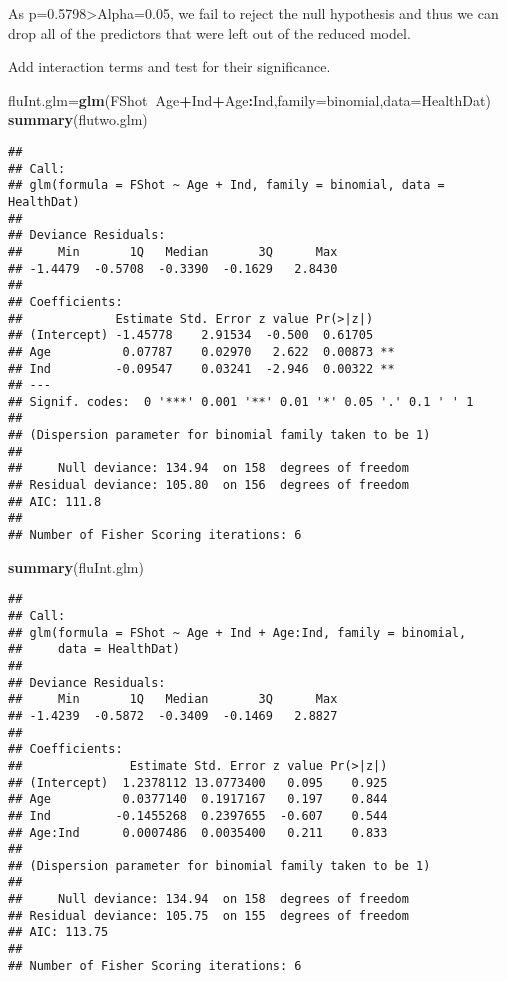 \documentclass[]{article}
\newenvironment{Shaded}{\begin{snugshade}}{\end{snugshade}}
\newcommand{\KeywordTok}[1]{\textcolor[rgb]{0.13,0.29,0.53}{\textbf{#1}}}
\newcommand{\DataTypeTok}[1]{\textcolor[rgb]{0.13,0.29,0.53}{#1}}
\newcommand{\OperatorTok}[1]{\textcolor[rgb]{0.81,0.36,0.00}{\textbf{#1}}}
\newcommand{\NormalTok}[1]{#1}
\begin{document}
As p=0.5798\textgreater{}Alpha=0.05, we fail to reject the null
hypothesis and thus we can drop all of the predictors that were left out
of the reduced model.

Add interaction terms and test for their significance.

\begin{Shaded}
\begin{Highlighting}[]
\NormalTok{fluInt.glm=}\KeywordTok{glm}\NormalTok{(FShot}\OperatorTok{~}\NormalTok{Age}\OperatorTok{+}\NormalTok{Ind}\OperatorTok{+}\NormalTok{Age}\OperatorTok{:}\NormalTok{Ind,}\DataTypeTok{family=}\NormalTok{binomial,}\DataTypeTok{data=}\NormalTok{HealthDat)}
\KeywordTok{summary}\NormalTok{(flutwo.glm)}
\end{Highlighting}
\end{Shaded}

\begin{verbatim}
## 
## Call:
## glm(formula = FShot ~ Age + Ind, family = binomial, data = HealthDat)
## 
## Deviance Residuals: 
##     Min       1Q   Median       3Q      Max  
## -1.4479  -0.5708  -0.3390  -0.1629   2.8430  
## 
## Coefficients:
##             Estimate Std. Error z value Pr(>|z|)   
## (Intercept) -1.45778    2.91534  -0.500  0.61705   
## Age          0.07787    0.02970   2.622  0.00873 **
## Ind         -0.09547    0.03241  -2.946  0.00322 **
## ---
## Signif. codes:  0 '***' 0.001 '**' 0.01 '*' 0.05 '.' 0.1 ' ' 1
## 
## (Dispersion parameter for binomial family taken to be 1)
## 
##     Null deviance: 134.94  on 158  degrees of freedom
## Residual deviance: 105.80  on 156  degrees of freedom
## AIC: 111.8
## 
## Number of Fisher Scoring iterations: 6
\end{verbatim}

\begin{Shaded}
\begin{Highlighting}[]
\KeywordTok{summary}\NormalTok{(fluInt.glm)}
\end{Highlighting}
\end{Shaded}

\begin{verbatim}
## 
## Call:
## glm(formula = FShot ~ Age + Ind + Age:Ind, family = binomial, 
##     data = HealthDat)
## 
## Deviance Residuals: 
##     Min       1Q   Median       3Q      Max  
## -1.4239  -0.5872  -0.3409  -0.1469   2.8827  
## 
## Coefficients:
##               Estimate Std. Error z value Pr(>|z|)
## (Intercept)  1.2378112 13.0773400   0.095    0.925
## Age          0.0377140  0.1917167   0.197    0.844
## Ind         -0.1455268  0.2397655  -0.607    0.544
## Age:Ind      0.0007486  0.0035400   0.211    0.833
## 
## (Dispersion parameter for binomial family taken to be 1)
## 
##     Null deviance: 134.94  on 158  degrees of freedom
## Residual deviance: 105.75  on 155  degrees of freedom
## AIC: 113.75
## 
## Number of Fisher Scoring iterations: 6
\end{verbatim}
\end{document}
